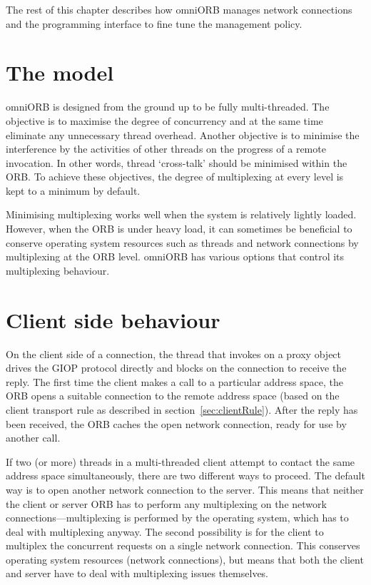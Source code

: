 \documentclass[11pt,twoside,a4paper]{book}
\begin{document}
The rest of this chapter describes how omniORB manages network
connections and the programming interface to fine tune the management
policy.


\section{The model}

omniORB is designed from the ground up to be fully multi-threaded. The
objective is to maximise the degree of concurrency and at the same
time eliminate any unnecessary thread overhead. Another objective is
to minimise the interference by the activities of other threads on the
progress of a remote invocation. In other words, thread `cross-talk'
should be minimised within the ORB. To achieve these objectives, the
degree of multiplexing at every level is kept to a minimum by default.

Minimising multiplexing works well when the system is relatively
lightly loaded. However, when the ORB is under heavy load, it can
sometimes be beneficial to conserve operating system resources such as
threads and network connections by multiplexing at the ORB
level. omniORB has various options that control its multiplexing
behaviour.


\section{Client side behaviour}

On the client side of a connection, the thread that invokes on a proxy
object drives the GIOP protocol directly and blocks on the connection
to receive the reply. The first time the client makes a call to a
particular address space, the ORB opens a suitable connection to the
remote address space (based on the client transport rule as described
in section~\ref{sec:clientRule}). After the reply has been received,
the ORB caches the open network connection, ready for use by another
call.

If two (or more) threads in a multi-threaded client attempt to contact
the same address space simultaneously, there are two different ways to
proceed. The default way is to open another network connection to the
server. This means that neither the client or server ORB has to
perform any multiplexing on the network connections---multiplexing is
performed by the operating system, which has to deal with multiplexing
anyway. The second possibility is for the client to multiplex the
concurrent requests on a single network connection. This conserves
operating system resources (network connections), but means that both
the client and server have to deal with multiplexing issues
themselves.
\end{document}
